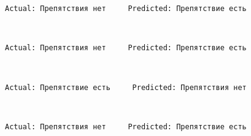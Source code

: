 \documentclass[11pt]{article}
\begin{document}
    \begin{Verbatim}[commandchars=\\\{\}]
Actual: Препятствия нет     Predicted: Препятствие есть

    \end{Verbatim}

    \begin{center}
    \end{center}
    { \hspace*{\fill} \\}
    
    \begin{Verbatim}[commandchars=\\\{\}]
Actual: Препятствия нет     Predicted: Препятствие есть

    \end{Verbatim}

    \begin{center}
    \end{center}
    { \hspace*{\fill} \\}
    
    \begin{Verbatim}[commandchars=\\\{\}]
Actual: Препятствие есть     Predicted: Препятствия нет

    \end{Verbatim}

    \begin{center}
    \end{center}
    { \hspace*{\fill} \\}
    
    \begin{Verbatim}[commandchars=\\\{\}]
Actual: Препятствия нет     Predicted: Препятствие есть

    \end{Verbatim}

    \begin{center}
    \end{center}
    { \hspace*{\fill} \\}
    
\end{document}
